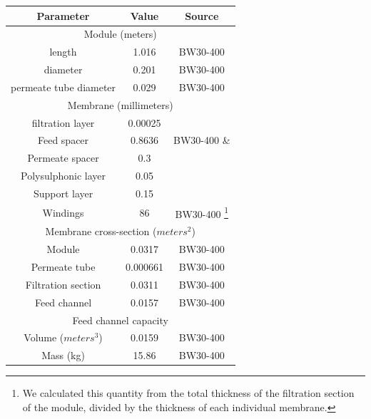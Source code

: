 \documentclass[fleqn,10pt]{wlscirep}
\begin{document}
\begin{savenotes}
\begin{table}[!h]
    \centering
    \begin{tabular}{|c|c|c|}
        \toprule
        \textbf{Parameter} & \textbf{Value} & \textbf{Source} \\ \midrule
        
        \multicolumn{3}{c}{Module (meters)} \\ \midrule
        length & 1.016 & BW30-400 \cite{2020FilmTecElement} \\ 
        diameter & 0.201 & BW30-400 \cite{2020FilmTecElement}\\
        permeate tube diameter & 0.029 & BW30-400 \cite{2020FilmTecElement}\\ \midrule
        
        \multicolumn{3}{c}{Membrane (millimeters)} \\ \midrule
        filtration layer & 0.00025 & \cite{Pacheco2010CharacterizationTechniques,Jeong2007InterfacialMembranes} \\
        Feed spacer & 0.8636 & BW30-400 \cite{2020FilmTecElement} \& \cite{Sablani2002InfluenceSystems} \\
        Permeate spacer & 0.3 & \cite{} \\
        Polysulphonic layer & 0.05 & \cite{} \\
        Support layer & 0.15 & \cite{} \\
        Windings & 86 & BW30-400 
        \footnote{We calculated this quantity from the total thickness of the filtration section of the module, divided by the thickness of each individual membrane.}\\ \midrule
        
        \multicolumn{3}{c}{Membrane cross-section ($meters^2$)} \\ \midrule
        Module & 0.0317 & BW30-400 \cite{2020FilmTecElement}\\
        Permeate tube & 0.000661 & BW30-400 \cite{2020FilmTecElement}\\
        Filtration section & 0.0311 & BW30-400 \cite{2020FilmTecElement}\\
        Feed channel & 0.0157 & BW30-400 \cite{2020FilmTecElement}\\ \midrule
        
        \multicolumn{3}{c}{Feed channel capacity} \\ \midrule
        Volume ($meters^3$) & 0.0159 & BW30-400 \cite{2020FilmTecElement}\\
        Mass (kg) & 15.86 & BW30-400 \cite{2020FilmTecElement}\\ \midrule


\end{tabular}
\end{table}
\end{savenotes}
\end{document}

